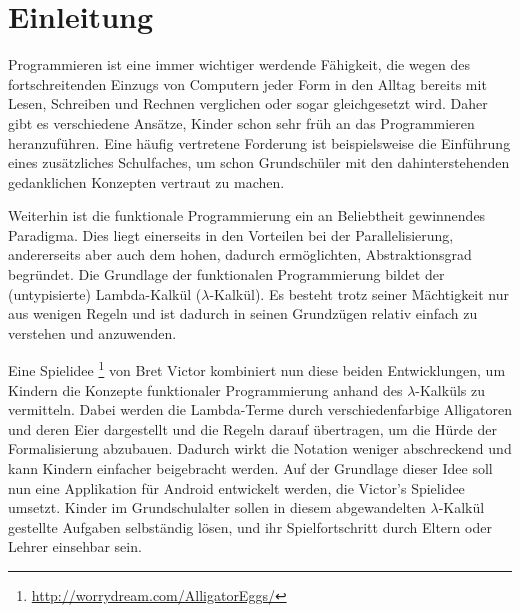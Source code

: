 \section{Einleitung}

Programmieren ist eine immer wichtiger werdende Fähigkeit, die wegen des fortschreitenden Einzugs von Computern jeder Form in den Alltag bereits mit Lesen, Schreiben und Rechnen verglichen oder sogar gleichgesetzt wird.
Daher gibt es verschiedene Ansätze, Kinder schon sehr früh an das Programmieren heranzuführen.
Eine häufig vertretene Forderung ist beispielsweise die Einführung eines zusätzliches Schulfaches, um schon Grundschüler mit den dahinterstehenden gedanklichen Konzepten vertraut zu machen.

Weiterhin ist die funktionale Programmierung ein an Beliebtheit gewinnendes Paradigma.
Dies liegt einerseits in den Vorteilen bei der Parallelisierung, andererseits aber auch dem hohen, dadurch ermöglichten, Abstraktionsgrad begründet.
Die Grundlage der funktionalen Programmierung bildet der (untypisierte) Lambda-Kalkül (\(\lambda\)-Kalkül).
Es besteht trotz seiner Mächtigkeit nur aus wenigen Regeln und ist dadurch in seinen Grundzügen relativ einfach zu verstehen und anzuwenden.

Eine Spielidee \footnote{\url{http://worrydream.com/AlligatorEggs/}} von Bret Victor kombiniert nun diese beiden Entwicklungen, um Kindern die Konzepte funktionaler Programmierung anhand des \(\lambda\)-Kalküls zu vermitteln.
Dabei werden die Lambda-Terme durch verschiedenfarbige Alligatoren und deren Eier dargestellt und die Regeln darauf übertragen, um die Hürde der Formalisierung abzubauen.
Dadurch wirkt die Notation weniger abschreckend und kann Kindern einfacher beigebracht werden.
Auf der Grundlage dieser Idee soll nun eine Applikation für Android entwickelt werden, die Victor's Spielidee umsetzt.
Kinder im Grundschulalter sollen in diesem abgewandelten \(\lambda\)-Kalkül gestellte Aufgaben selbständig lösen, und ihr Spielfortschritt durch Eltern oder Lehrer einsehbar sein.
